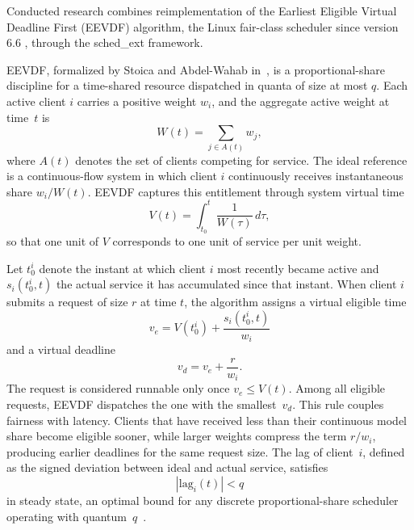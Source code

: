 \documentclass[a4paper]{article}
\begin{document}
Conducted research combines reimplementation of the
Earliest Eligible Virtual Deadline First (EEVDF) algorithm, the Linux fair-class scheduler
since version 6.6 \cite{EEVDF_intro}, through the sched\_ext framework.


EEVDF, formalized by Stoica and Abdel-Wahab in~\cite{stoica, stoica2}, is a proportional-share
discipline for a time-shared resource dispatched in quanta of size at most $ q $.
Each active client $ i $ carries a positive weight $ w_i $, and the aggregate
active weight at time~$ t $ is
\begin{equation}
    W(t)=\sum_{j\in A(t)} w_j ,
\end{equation}
where $ A(t) $ denotes the set of clients competing for service.
The ideal reference is a continuous-flow system in which client
$ i $ continuously receives instantaneous share $ w_i/W(t) $.
EEVDF captures this entitlement through system virtual time
\begin{equation}
    V(t)=\int_{t_0}^{t}\frac{1}{W(\tau)}\,d\tau ,
\end{equation}
so that one unit of $ V $ corresponds to one unit of service per unit weight.

Let $ t_0^i $ denote the instant at which client $ i $ most recently became
active and $ s_i(t_0^i,t) $ the actual service it has accumulated since that
instant. When client $ i $ submits a request of size $ r $ at time $ t $,
the algorithm assigns a virtual eligible time
\begin{equation}
    v_e = V(t_0^i)+\frac{s_i(t_0^i,t)}{w_i}
\end{equation}
and a virtual deadline
\begin{equation}
    v_d = v_e + \frac{r}{w_i} .
\end{equation}
The request is considered runnable only once $ v_e \le V(t) $.
Among all eligible requests, EEVDF dispatches the one with the
smallest~$ v_d $. This rule couples fairness with latency.
Clients that have received less than their continuous model share become
eligible sooner, while larger weights compress the term $ r/w_i $,
producing earlier deadlines for the same request size.
The lag of client~$ i $, defined as the signed deviation between ideal
and actual service, satisfies
\begin{equation}
    |\mathrm{lag}_i(t)|<q
\end{equation}
in steady state, an optimal bound for any discrete proportional-share
scheduler operating with quantum~$ q $~\cite{stoica, stoica2}.
\end{document}
